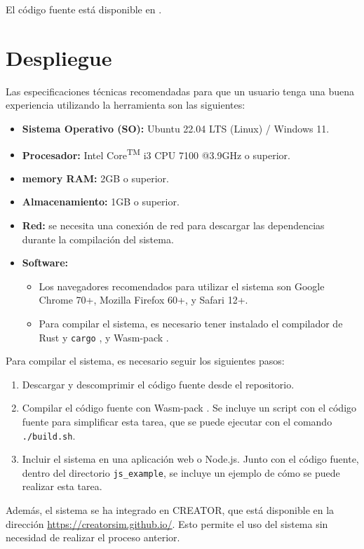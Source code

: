 \noindent
El código fuente está disponible en \myrepo.

\FloatBarrier

\section{Despliegue}\label{sec:deployment}

\noindent
Las especificaciones técnicas recomendadas para que un usuario tenga una buena
experiencia utilizando la herramienta son las siguientes:

\begin{itemize}
    \item \textbf{Sistema Operativo (SO):} Ubuntu 22.04 LTS (Linux) / Windows 11.
    \item \textbf{Procesador:} Intel\textsuperscript{\textregistered} Core\textsuperscript{TM} i3 CPU 7100 @3.9GHz o superior.
    \item \textbf{\Gls{memory} RAM:} 2GB o superior.
    \item \textbf{Almacenamiento:} 1GB o superior.
    \item \textbf{Red:} se necesita una conexión de red para descargar las
    dependencias durante la compilación del sistema.
    \item \textbf{Software:}
    \begin{itemize}
        \item Los navegadores recomendados para utilizar el sistema son Google
        Chrome 70+, Mozilla Firefox 60+, y Safari 12+.
        \item Para compilar el sistema, es necesario tener instalado el compilador
        de Rust y \verb!cargo! \parencite{rust-toolchain}, y Wasm-pack
        \parencite{Wasm-pack}.
    \end{itemize}
\end{itemize}

\noindent
Para compilar el sistema, es necesario seguir los siguientes pasos:

\begin{enumerate}
    \item Descargar y descomprimir el código fuente desde el repositorio.
    \item Compilar el código fuente con Wasm-pack \parencite{Wasm-pack}. Se
    incluye un script con el código fuente para simplificar esta tarea,
    que se puede ejecutar con el comando \verb!./build.sh!.
    \item Incluir el sistema en una aplicación web o Node.js. Junto con el
    código fuente, dentro del directorio \verb!js_example!, se incluye un
    ejemplo de cómo se puede realizar esta tarea.
\end{enumerate}

Además, el sistema se ha integrado en CREATOR, que está disponible en la
dirección \url{https://creatorsim.github.io/}. Esto permite el uso del sistema
sin necesidad de realizar el proceso anterior.
